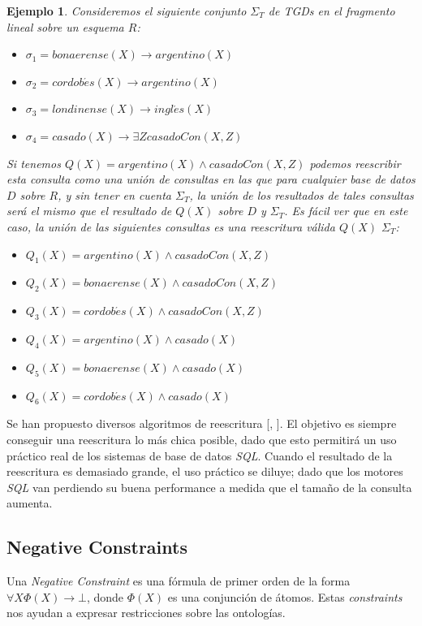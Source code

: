 \documentclass[11pt,a4paper,twoside]{tesis}
\newtheorem{exmp}{Ejemplo}
\begin{document}
\begin{exmp}\label{ejemplo_rewrite}
Consideremos el siguiente conjunto $\Sigma_T$ de TGDs en el fragmento \textit{lineal} sobre un esquema $R$:
    \begin{itemize}
        \item $\sigma_1 = bonaerense(X) \rightarrow argentino(X)$
        \item $\sigma_2 = cordob\acute{e}s(X) \rightarrow argentino(X)$
        \item $\sigma_3 = londinense(X) \rightarrow ingl\acute{e}s(X)$
        \item $\sigma_4 = casado(X) \rightarrow \exists Z casadoCon(X, Z)$
    \end{itemize}
Si tenemos $Q(X) = argentino(X) \land casadoCon(X, Z)$ podemos reescribir esta consulta como una unión de consultas en las que para cualquier base de datos $D$ sobre $R$, y sin tener en cuenta $\Sigma_T$, la unión de los resultados de tales consultas será el mismo que el resultado de $Q(X)$ sobre $D$ y $\Sigma_T$. Es fácil ver que en este caso, la unión de las siguientes consultas es una reescritura válida $Q(X)$ $\Sigma_T$:

    \begin{itemize}
        \item $Q_1(X) = argentino(X) \land casadoCon(X, Z)$
        \item $Q_2(X) = bonaerense(X) \land casadoCon(X, Z)$
        \item $Q_3(X) = cordob\acute{e}s(X) \land casadoCon(X, Z)$
        \item $Q_4(X) = argentino(X) \land casado(X)$
        \item $Q_5(X) = bonaerense(X) \land casado(X)$
        \item $Q_6(X) = cordob\acute{e}s(X) \land casado(X)$
    \end{itemize}
\end{exmp}

Se han propuesto diversos algoritmos de reescritura [\cite{Kewen}, \cite{Gottlob}]. El objetivo es siempre conseguir una reescritura lo más chica posible, dado que esto permitirá un uso práctico real de los sistemas de base de datos \textit{SQL}. Cuando el resultado de la reescritura es demasiado grande, el uso práctico se diluye; dado que los motores \textit{SQL} van perdiendo su buena performance a medida que el tamaño de la consulta aumenta. 

\subsection{Negative Constraints}\label{ncs}
Una \textit{Negative Constraint} es una fórmula de primer orden de la forma $\forall X \Phi (X) \rightarrow \bot$, donde $\Phi(X)$ es una conjunción de átomos. Estas \textit{constraints} nos ayudan a expresar restricciones sobre las ontologías.
\end{document}
